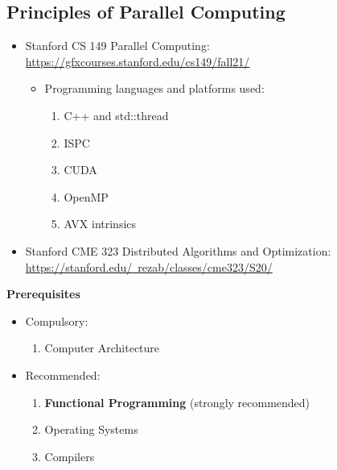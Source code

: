 \documentclass{article}
\begin{document}
\subsection{Principles of Parallel Computing}
\begin{itemize}
    \item Stanford CS 149 Parallel Computing:
    \href{https://gfxcourses.stanford.edu/cs149/fall21/}{https://gfxcourses.stanford.edu/cs149/fall21/}
    \begin{itemize}
        \item Programming languages and platforms used:
        \begin{enumerate}
            \item C++ and std::thread
            \item ISPC
            \item CUDA
            \item OpenMP
            \item AVX intrinsics
        \end{enumerate}
    \end{itemize}
    \item Stanford CME 323 Distributed Algorithms and Optimization:\\
    \href{https://stanford.edu/~rezab/classes/cme323/S20/}{https://stanford.edu/~rezab/classes/cme323/S20/}
\end{itemize}
\textbf{Prerequisites}
    \begin{itemize}
        \item Compulsory:
        \begin{enumerate}
        \item Computer Architecture
    \end{enumerate}
        \item Recommended:
        \begin{enumerate}
            \item \textbf{Functional Programming} (strongly recommended)
            \item Operating Systems
            \item Compilers
        \end{enumerate}
    \end{itemize}
\end{document}
